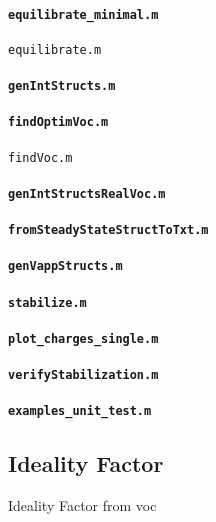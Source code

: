 \paragraph{\texttt{equilibrate_minimal.m}}

\texttt{equilibrate.m}

\paragraph{\texttt{genIntStructs.m}}


\paragraph{\texttt{findOptimVoc.m}}

\texttt{findVoc.m}

\paragraph{\texttt{genIntStructsRealVoc.m}}
\paragraph{\texttt{fromSteadyStateStructToTxt.m}}


\paragraph{\texttt{genVappStructs.m}}
\paragraph{\texttt{stabilize.m}}
\paragraph{\texttt{plot_charges_single.m}}
\paragraph{\texttt{verifyStabilization.m}}

\paragraph{\texttt{examples_unit_test.m}}

\subsection{Ideality Factor}\label{dd_ideality}
Ideality Factor from \gls{voc}

